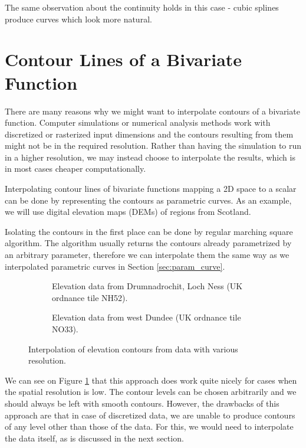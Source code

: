 \documentclass[a4paper,10pt]{report}
\begin{document}
The same observation about the continuity holds in this case - cubic splines produce curves which look more natural.

\section{Contour Lines of a Bivariate Function}
There are many reasons why we might want to interpolate contours of a bivariate function. Computer simulations or numerical analysis methods work with discretized or rasterized input dimensions and the contours resulting from them might not be in the required resolution. Rather than having the simulation to run in a higher resolution, we may instead choose to interpolate the results, which is in most cases cheaper computationally.

Interpolating contour lines of bivariate functions mapping a 2D space to a scalar can be done by representing the contours as parametric curves. As an example, we will use digital elevation maps (DEMs) of regions from Scotland.

Isolating the contours in the first place can be done by regular marching square algorithm. The algorithm usually returns the contours already parametrized by an arbitrary parameter, therefore we can interpolate them the same way as we interpolated parametric curves in Section \ref{sec:param_curve}.

\begin{figure}[H]
    \centering
    \begin{subfigure}{\textwidth}
        
    \caption{Elevation data from Drumnadrochit, Loch Ness (UK ordnance tile NH52).}
    \end{subfigure}
    \begin{subfigure}{\textwidth}
        
    \caption{Elevation data from west Dundee (UK ordnance tile NO33).}
    \end{subfigure}
    \caption{Interpolation of elevation contours from data with various resolution.}
    \label{fig:2D_contour}
\end{figure}

We can see on Figure \ref{fig:2D_contour} that this approach does work quite nicely for cases when the spatial resolution is low. The contour levels can be chosen arbitrarily and we should always be left with smooth contours. However, the drawbacks of this approach are that in case of discretized data, we are unable to produce contours of any level other than those of the data. For this, we would need to interpolate the data itself, as is discussed in the next section.
\end{document}
